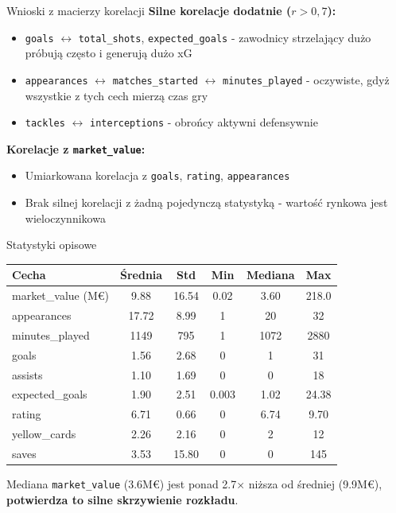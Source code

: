 \documentclass[aspectratio=169]{beamer}
\begin{document}
\begin{frame}{Wnioski z macierzy korelacji}
        \textbf{Silne korelacje dodatnie ($r > 0{,}7$):}
        \begin{itemize}
            \item \texttt{goals} $\leftrightarrow$ \texttt{total\_shots}, \texttt{expected\_goals} - zawodnicy strzelający dużo próbują często i generują dużo xG
            \item \texttt{appearances} $\leftrightarrow$ \texttt{matches\_started} $\leftrightarrow$ \texttt{minutes\_played} - oczywiste, gdyż wszystkie z tych cech mierzą czas gry
            \item \texttt{tackles} $\leftrightarrow$ \texttt{interceptions} - obrońcy aktywni defensywnie
        \end{itemize}

        \vspace{0.5cm}

        \textbf{Korelacje z \texttt{market\_value}:}
        \begin{itemize}
            \item Umiarkowana korelacja z \texttt{goals}, \texttt{rating}, \texttt{appearances}
            \item Brak silnej korelacji z żadną pojedynczą statystyką - wartość rynkowa jest wieloczynnikowa
        \end{itemize}

\end{frame}

\begin{frame}{Statystyki opisowe}
    \small{
    \begin{tabular}{lccccc}
            \toprule
            \textbf{Cecha} & \textbf{Średnia} & \textbf{Std} & \textbf{Min} & \textbf{Mediana} & \textbf{Max} \\
            \midrule
            market\_value (M€) & 9.88 & 16.54 & 0.02 & 3.60 & 218.0 \\
            appearances & 17.72 & 8.99 & 1 & 20 & 32 \\
            minutes\_played & 1149 & 795 & 1 & 1072 & 2880 \\
            goals & 1.56 & 2.68 & 0 & 1 & 31 \\
            assists & 1.10 & 1.69 & 0 & 0 & 18 \\
            expected\_goals & 1.90 & 2.51 & 0.003 & 1.02 & 24.38 \\
            rating & 6.71 & 0.66 & 0 & 6.74 & 9.70 \\
            yellow\_cards & 2.26 & 2.16 & 0 & 2 & 12 \\
            saves & 3.53 & 15.80 & 0 & 0 & 145 \\
            \bottomrule
        \end{tabular}
    }
    \vspace{0.5cm}
    
        Mediana \texttt{market\_value} (3.6M€) jest ponad 2.7× niższa od średniej (9.9M€), \textbf{potwierdza to silne skrzywienie rozkładu}.
    
\end{frame}
\end{document}
